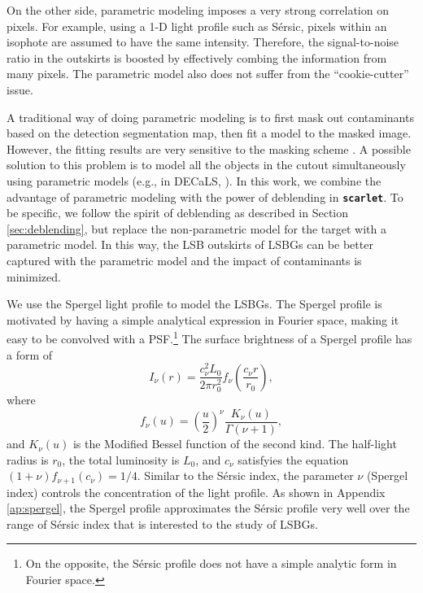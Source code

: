 \documentclass[twocolumn,astrosymb,twocolappendix]{aastex631}
\newcommand{\code}[1]{\textbf{\texttt{#1}}}
\newcommand{\sersic}{S\'ersic}
\begin{document}
\begin{CJK*}{UTF8}{gbsn}
On the other side, parametric modeling imposes a very strong correlation on pixels. For example, using a 1-D light profile such as \sersic{}, pixels within an isophote are assumed to have the same intensity. Therefore, the signal-to-noise ratio in the outskirts is boosted by effectively combing the information from many pixels. The parametric model also does not suffer from the ``cookie-cutter'' issue. 

A traditional way of doing parametric modeling is to first mask out contaminants based on the detection segmentation map, then fit a model to the masked image. However, the fitting results are very sensitive to the masking scheme \citep[e.g.,][]{Greco2018}. A possible solution to this problem is to model all the objects in the cutout simultaneously using parametric models (e.g., in DECaLS, \citealt{Dey2019}). In this work, we combine the advantage of parametric modeling with the power of deblending in \code{scarlet}. To be specific, we follow the spirit of deblending as described in Section \ref{sec:deblending}, but replace the non-parametric model for the target with a parametric model. In this way, the LSB outskirts of LSBGs can be better captured with the parametric model and the impact of contaminants is minimized. 

We use the Spergel light profile to model the LSBGs. The Spergel profile is motivated by having a simple analytical expression in Fourier space, making it easy to be convolved with a PSF.\footnote{On the opposite, the \sersic{} profile does not have a simple analytic form in Fourier space.} The surface brightness of a Spergel profile \citep{Spergel2010} has a form of
\begin{equation}
    \label{eq:spergel}
    I_\nu(r) = \frac{c_{\nu}^{2} L_{0}}{2\pi r_{0}^{2}} f_{\nu}\left(\frac{c_{\nu} r}{r_{0}}\right),
\end{equation}
where 
\begin{equation}
    f_{\nu}(u)=\left(\frac{u}{2}\right)^{\nu} \frac{K_{\nu}(u)}{\Gamma(\nu+1)},
\end{equation}
and $K_\nu(u)$ is the Modified Bessel function of the second kind. The half-light radius is $r_0$, the total luminosity is $L_0$, and $c_\nu$ satisfyies the equation $(1 + \nu)f_{\nu + 1}(c_\nu) = 1/4$. Similar to the \sersic{} index, the parameter $\nu$ (Spergel index) controls the concentration of the light profile. As shown in Appendix \ref{ap:spergel}, the Spergel profile approximates the \sersic{} profile very well over the range of \sersic{} index that is interested to the study of LSBGs.


\end{CJK*}
\end{document}
